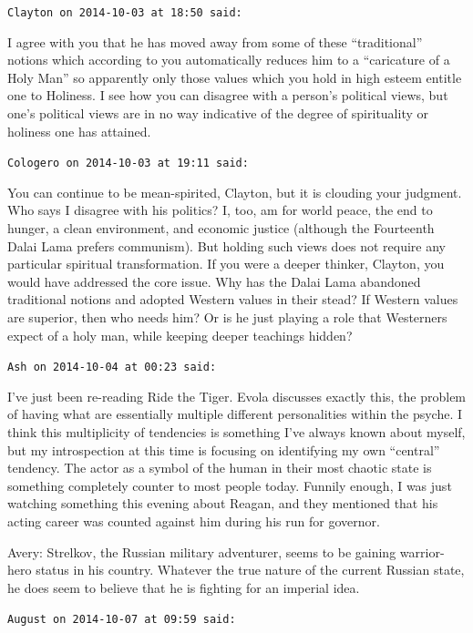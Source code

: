 \begin{footnotesize}
\begin{sffamily}
\hfill

\texttt{Clayton on 2014-10-03 at 18:50 said:}

I agree with you that he has moved away from some of these ``traditional'' notions which according to you automatically reduces him to a ``caricature of a Holy Man'' so apparently only those values which you hold in high esteem entitle one to Holiness. I see how you can disagree with a person's political views, but one's political views are in no way indicative of the degree of spirituality or holiness one has attained.

\hfill

\texttt{Cologero on 2014-10-03 at 19:11 said:}

You can continue to be mean-spirited, Clayton, but it is clouding your judgment. Who says I disagree with his politics? I, too, am for world peace, the end to hunger, a clean environment, and economic justice (although the Fourteenth Dalai Lama prefers communism). But holding such views does not require any particular spiritual transformation. If you were a deeper thinker, Clayton, you would have addressed the core issue. Why has the Dalai Lama abandoned traditional notions and adopted Western values in their stead? If Western values are superior, then who needs him? Or is he just playing a role that Westerners expect of a holy man, while keeping deeper teachings hidden?

\hfill

\texttt{Ash on 2014-10-04 at 00:23 said:}

I've just been re-reading Ride the Tiger. Evola discusses exactly this, the problem of having what are essentially multiple different personalities within the psyche. I think this multiplicity of tendencies is something I've always known about myself, but my introspection at this time is focusing on identifying my own ``central'' tendency. The actor as a symbol of the human in their most chaotic state is something completely counter to most people today. Funnily enough, I was just watching something this evening about Reagan, and they mentioned that his acting career was counted against him during his run for governor.

Avery: Strelkov, the Russian military adventurer, seems to be gaining warrior-hero status in his country. Whatever the true nature of the current Russian state, he does seem to believe that he is fighting for an imperial idea.

\hfill

\texttt{August on 2014-10-07 at 09:59 said:}


\end{sffamily}
\end{footnotesize}
